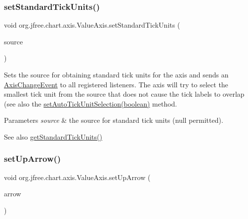 \subsubsection{\texorpdfstring{set\+Standard\+Tick\+Units()}{setStandardTickUnits()}}
{\footnotesize\ttfamily void org.\+jfree.\+chart.\+axis.\+Value\+Axis.\+set\+Standard\+Tick\+Units (\begin{DoxyParamCaption}\item[{\mbox{\hyperlink{interfaceorg_1_1jfree_1_1chart_1_1axis_1_1_tick_unit_source}{Tick\+Unit\+Source}}}]{source }\end{DoxyParamCaption})}

Sets the source for obtaining standard tick units for the axis and sends an \mbox{\hyperlink{}{Axis\+Change\+Event}} to all registered listeners. The axis will try to select the smallest tick unit from the source that does not cause the tick labels to overlap (see also the \mbox{\hyperlink{classorg_1_1jfree_1_1chart_1_1axis_1_1_value_axis_a7366393f75b07420136f449d351deb08}{set\+Auto\+Tick\+Unit\+Selection(boolean)}} method.


\begin{DoxyParams}{Parameters}
{\em source} & the source for standard tick units ({\ttfamily null} permitted).\\
\hline
\end{DoxyParams}
\begin{DoxySeeAlso}{See also}
\mbox{\hyperlink{classorg_1_1jfree_1_1chart_1_1axis_1_1_value_axis_afe89ca3b6b4503e8f97ec9173d1f49f7}{get\+Standard\+Tick\+Units()}} 
\end{DoxySeeAlso}
\mbox{\label{classorg_1_1jfree_1_1chart_1_1axis_1_1_value_axis_ab951a2ddff08bc090fc5b9ea4291aa8c}} 
\subsubsection{\texorpdfstring{set\+Up\+Arrow()}{setUpArrow()}}
{\footnotesize\ttfamily void org.\+jfree.\+chart.\+axis.\+Value\+Axis.\+set\+Up\+Arrow (\begin{DoxyParamCaption}\item[{Shape}]{arrow }\end{DoxyParamCaption})}


